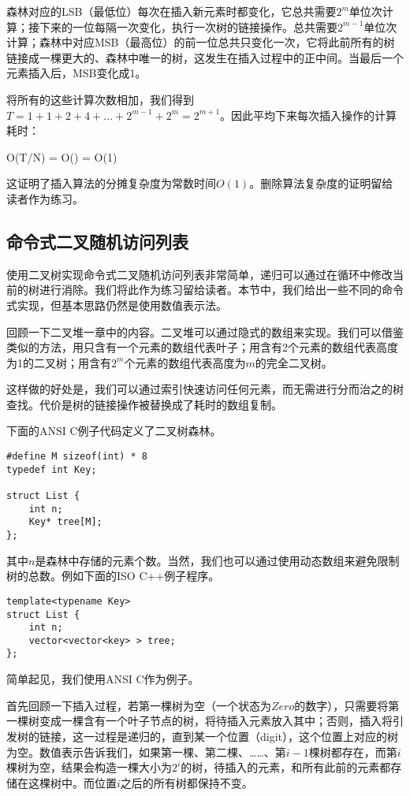\documentclass[UTF8]{article}
\begin{document}
森林对应的LSB（最低位）每次在插入新元素时都变化，它总共需要$2^m$单位次计算；接下来的一位每隔一次变化，执行一次树的链接操作。总共需要$2^{m-1}$单位次计算；森林中对应MSB（最高位）的前一位总共只变化一次，它将此前所有的树链接成一棵更大的、森林中唯一的树，这发生在插入过程中的正中间。当最后一个元素插入后，MSB变化成1。

将所有的这些计算次数相加，我们得到$T = 1 + 1 + 2 + 4 + ... + 2^{m-1} + 2^m = 2^{m+1}$。因此平均下来每次插入操作的计算耗时：

\be
O(T/N) = O() = O(1)
\ee

这证明了插入算法的分摊复杂度为常数时间$O(1)$。删除算法复杂度的证明留给读者作为练习。

\subsection{命令式二叉随机访问列表}

使用二叉树实现命令式二叉随机访问列表非常简单，递归可以通过在循环中修改当前的树进行消除。我们将此作为练习留给读者。本节中，我们给出一些不同的命令式实现，但基本思路仍然是使用数值表示法。

回顾一下二叉堆一章中的内容。二叉堆可以通过隐式的数组来实现。我们可以借鉴类似的方法，用只含有一个元素的数组代表叶子；用含有2个元素的数组代表高度为1的二叉树；用含有$2^m$个元素的数组代表高度为$m$的完全二叉树。

这样做的好处是，我们可以通过索引快速访问任何元素，而无需进行分而治之的树查找。代价是树的链接操作被替换成了耗时的数组复制。

下面的ANSI C例子代码定义了二叉树森林。

\lstset{language=C}
\begin{lstlisting}
#define M sizeof(int) * 8
typedef int Key;

struct List {
    int n;
    Key* tree[M];
};
\end{lstlisting}

其中$n$是森林中存储的元素个数。当然，我们也可以通过使用动态数组来避免限制树的总数。例如下面的ISO C++例子程序。

\lstset{language=C++}
\begin{lstlisting}
template<typename Key>
struct List {
    int n;
    vector<vector<key> > tree;
};
\end{lstlisting}

简单起见，我们使用ANSI C作为例子。

首先回顾一下插入过程，若第一棵树为空（一个状态为$Zero$的数字），只需要将第一棵树变成一棵含有一个叶子节点的树，将待插入元素放入其中；否则，插入将引发树的链接，这一过程是递归的，直到某一个位置（digit），这个位置上对应的树为空。数值表示告诉我们，如果第一棵、第二棵、……、第$i-1$棵树都存在，而第$i$棵树为空，结果会构造一棵大小为$2^i$的树，待插入的元素，和所有此前的元素都存储在这棵树中。而位置$i$之后的所有树都保持不变。
\end{document}
